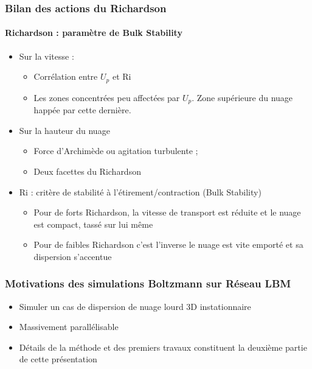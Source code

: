 \documentclass[12pt, xcolor=svgnames]{beamer}
\newcommand{\bwarrow}{\item[\color{DarkRed} \ding{227}]}
\newcommand{\warrow}{\item[\color{blue!50!black!70} \tiny{\ding{109}}]}
\begin{document}
\begin{frame}
\frametitle{Bilan des actions du Richardson}
\framesubtitle{Richardson : paramètre de Bulk Stability}
\begin{itemize}
	\bwarrow Sur la vitesse :
	\begin{itemize}
		\warrow Corrélation entre $U_p$ et Ri
		\warrow Les zones concentrées peu affectées par $U_p$. Zone supérieure du nuage happée par cette dernière.\\[3mm]
	\end{itemize}
	\pause
	\bwarrow Sur la hauteur du nuage
	\begin{itemize}
		\warrow Force d'Archimède ou agitation turbulente ;
		\warrow Deux facettes du Richardson \\[3mm]
	\end{itemize}
	\pause
	\bwarrow Ri : critère de stabilité à l'étirement/contraction (Bulk Stability)
		\begin{itemize}
		\warrow Pour de forts Richardson, la vitesse de transport est réduite et le nuage est compact, tassé sur lui même 
		\warrow Pour de faibles Richardson c'est l'inverse le nuage est vite emporté et sa dispersion s'accentue
		\end{itemize}
\end{itemize}
\end{frame}

\begin{frame}
\frametitle{Motivations des simulations Boltzmann sur Réseau LBM}
\begin{itemize}
	\bwarrow Simuler un cas de dispersion de nuage lourd 3D instationnaire \\[2mm]
	\bwarrow Massivement parallélisable \\[2cm]
	\bwarrow Détails de la méthode et des premiers travaux constituent la deuxième partie de cette présentation 
\end{itemize}
\end{frame}
\end{document}

